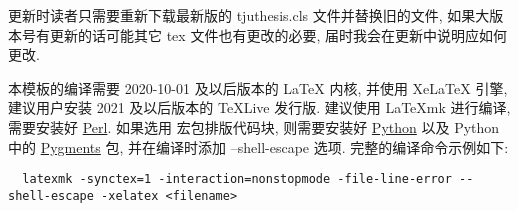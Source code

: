 更新时读者只需要重新下载最新版的 tjuthesis.cls 文件并替换旧的文件, 如果大版本号有更新的话可能其它 tex 文件也有更改的必要, 届时我会在更新中说明应如何更改.

本模板的编译需要 2020-10-01 及以后版本的 LaTeX 内核, 并使用 XeLaTeX 引擎, 建议用户安装 2021 及以后版本的 TeXLive 发行版. 建议使用 LaTeXmk 进行编译, 需要安装好 \href{https://www.perl.org/get.html}{Perl}. 如果选用  宏包排版代码块, 则需要安装好 \href{https://wiki.python.org/moin/BeginnersGuide/Download}{Python} 以及 Python 中的 \href{https://pygments.org/download/}{Pygments} 包, 并在编译时添加 --shell-escape 选项. 完整的编译命令示例如下:
\begin{verbatim}
  latexmk -synctex=1 -interaction=nonstopmode -file-line-error --shell-escape -xelatex <filename>
\end{verbatim}
